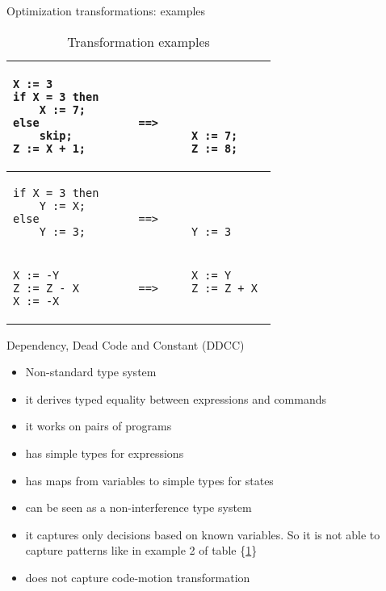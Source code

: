 \documentclass[11pt]{beamer}
\begin{document}
\begin{frame}[fragile]{Optimization transformations: examples}
\begin{table}
\begin{tabular}{l}
\hline
\begin{lstlisting}
X := 3				
if X = 3 then		
    X := 7;		    
else               ==>     
    skip;                  X := 7;
Z := X + 1;                Z := 8;
\end{lstlisting}\\
\hline
\begin{lstlisting}
if X = 3 then            
    Y := X;                
else               ==>                
    Y := 3;                Y := 3
\end{lstlisting}\\
\hline
\begin{lstlisting}
X := -Y                    X := Y
Z := Z - X         ==>     Z := Z + X
X := -X                    
\end{lstlisting}\\
\hline
\end{tabular}
\caption{Transformation examples}
\label{Examples}
\end{table}
\end{frame}

\begin{frame}{Dependency, Dead Code and Constant (DDCC)}
\begin{itemize}
\item Non-standard type system
\item it derives typed equality between expressions and commands
\item it works on pairs of programs
\item has simple types for expressions
\item has maps from variables to simple types for states
\item can be seen as a non-interference type system 
\item it captures only decisions based on known variables. So it is not able to capture patterns like in example 2 of table \{\ref{Examples}\}
\item does not capture code-motion transformation
\end{itemize}
\end{frame}
\end{document}
